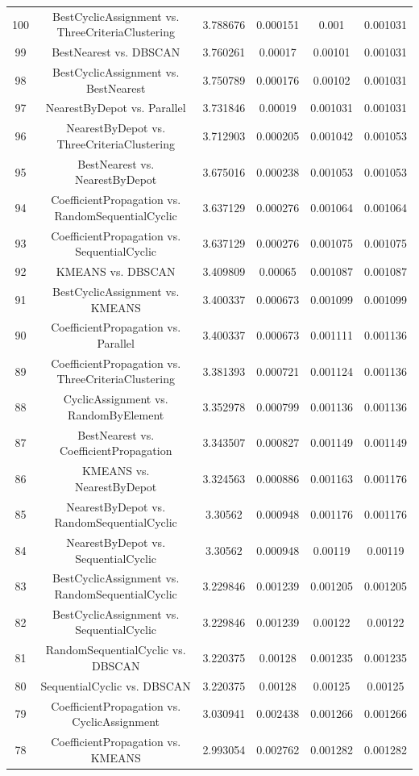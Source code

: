 \documentclass[a4paper,10pt]{article}
\begin{document}
\begin{landscape}
\begin{table}[!htp]
\begin{tabular}{cccccc}
100&BestCyclicAssignment vs. ThreeCriteriaClustering&3.788676&0.000151&0.001&0.001031\\
99&BestNearest vs. DBSCAN&3.760261&0.00017&0.00101&0.001031\\
98&BestCyclicAssignment vs. BestNearest&3.750789&0.000176&0.00102&0.001031\\
97&NearestByDepot vs. Parallel&3.731846&0.00019&0.001031&0.001031\\
96&NearestByDepot vs. ThreeCriteriaClustering&3.712903&0.000205&0.001042&0.001053\\
95&BestNearest vs. NearestByDepot&3.675016&0.000238&0.001053&0.001053\\
94&CoefficientPropagation vs. RandomSequentialCyclic&3.637129&0.000276&0.001064&0.001064\\
93&CoefficientPropagation vs. SequentialCyclic&3.637129&0.000276&0.001075&0.001075\\
92&KMEANS vs. DBSCAN&3.409809&0.00065&0.001087&0.001087\\
91&BestCyclicAssignment vs. KMEANS&3.400337&0.000673&0.001099&0.001099\\
90&CoefficientPropagation vs. Parallel&3.400337&0.000673&0.001111&0.001136\\
89&CoefficientPropagation vs. ThreeCriteriaClustering&3.381393&0.000721&0.001124&0.001136\\
88&CyclicAssignment vs. RandomByElement&3.352978&0.000799&0.001136&0.001136\\
87&BestNearest vs. CoefficientPropagation&3.343507&0.000827&0.001149&0.001149\\
86&KMEANS vs. NearestByDepot&3.324563&0.000886&0.001163&0.001176\\
85&NearestByDepot vs. RandomSequentialCyclic&3.30562&0.000948&0.001176&0.001176\\
84&NearestByDepot vs. SequentialCyclic&3.30562&0.000948&0.00119&0.00119\\
83&BestCyclicAssignment vs. RandomSequentialCyclic&3.229846&0.001239&0.001205&0.001205\\
82&BestCyclicAssignment vs. SequentialCyclic&3.229846&0.001239&0.00122&0.00122\\
81&RandomSequentialCyclic vs. DBSCAN&3.220375&0.00128&0.001235&0.001235\\
80&SequentialCyclic vs. DBSCAN&3.220375&0.00128&0.00125&0.00125\\
79&CoefficientPropagation vs. CyclicAssignment&3.030941&0.002438&0.001266&0.001266\\
78&CoefficientPropagation vs. KMEANS&2.993054&0.002762&0.001282&0.001282\\

\end{tabular}
\end{table}
\end{landscape}
\end{document}
